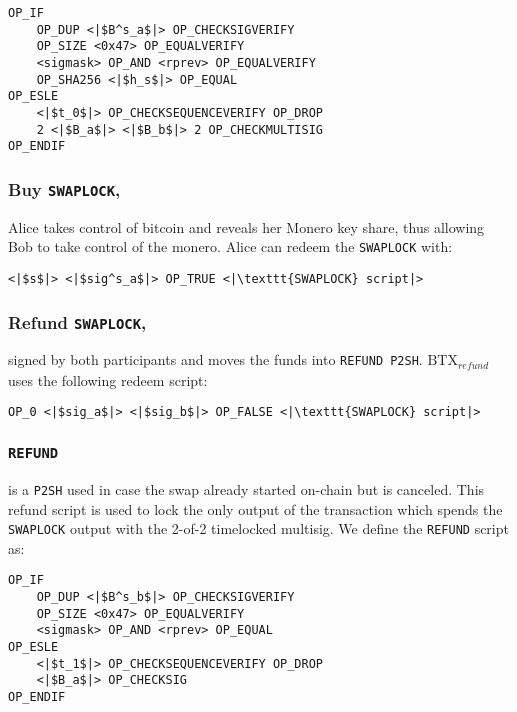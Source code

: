 \documentclass{llncs}
\begin{document}
\begin{verbatim}
OP_IF
    OP_DUP <|$B^s_a$|> OP_CHECKSIGVERIFY
    OP_SIZE <0x47> OP_EQUALVERIFY
    <sigmask> OP_AND <rprev> OP_EQUALVERIFY
    OP_SHA256 <|$h_s$|> OP_EQUAL
OP_ESLE
    <|$t_0$|> OP_CHECKSEQUENCEVERIFY OP_DROP
    2 <|$B_a$|> <|$B_b$|> 2 OP_CHECKMULTISIG
OP_ENDIF
\end{verbatim}

\subsubsection{Buy \texttt{SWAPLOCK},}
Alice takes control of bitcoin and reveals her Monero key share, thus allowing Bob to take control of the monero. Alice can redeem the \texttt{SWAPLOCK} with:

\begin{verbatim}
<|$s$|> <|$sig^s_a$|> OP_TRUE <|\texttt{SWAPLOCK} script|>
\end{verbatim}

\subsubsection{Refund \texttt{SWAPLOCK},}
signed by both participants and moves the funds into \texttt{REFUND P2SH}. $\text{BTX}_\textit{refund}$ uses the following redeem script:

\begin{verbatim}
OP_0 <|$sig_a$|> <|$sig_b$|> OP_FALSE <|\texttt{SWAPLOCK} script|>
\end{verbatim}

\subsubsection{\texttt{REFUND}}
is a \texttt{P2SH} used in case the swap already started on-chain but is canceled. This refund script is used to lock the only output of the transaction which spends the \texttt{SWAPLOCK} output with the 2-of-2 timelocked multisig. We define the \texttt{REFUND} script as:

\begin{verbatim}
OP_IF
    OP_DUP <|$B^s_b$|> OP_CHECKSIGVERIFY
    OP_SIZE <0x47> OP_EQUALVERIFY
    <sigmask> OP_AND <rprev> OP_EQUAL
OP_ESLE
    <|$t_1$|> OP_CHECKSEQUENCEVERIFY OP_DROP
    <|$B_a$|> OP_CHECKSIG
OP_ENDIF
\end{verbatim}
\end{document}
